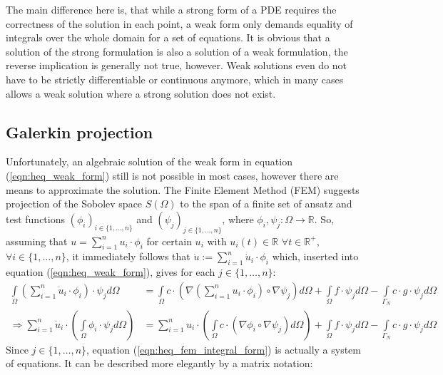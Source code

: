 \documentclass{IOS-Book-Article}
\theoremstyle{plain}
\theoremstyle{definition}
\begin{document}
The main difference here is, that while a strong form of a PDE requires the correctness of the solution in each point, a weak form only demands equality of integrals over the whole domain for a set of equations.
It is obvious that a solution of the strong formulation is also a solution of a weak formulation, the reverse implication is generally not true, however. Weak solutions even do not have to be strictly differentiable or continuous anymore, which in many cases allows a weak solution where a strong solution does not exist.

\subsection{Galerkin projection}

Unfortunately, an algebraic solution of the weak form in equation (\ref{eqn:heq_weak_form}) still is not possible in most cases, however there are means to approximate the solution.
The Finite Element Method (FEM) suggests projection of the Sobolev space $S(\Omega)$ to the span of a finite set of ansatz and test functions $(\phi_i)_{i \in \{1, \dots , n\}}$ and $(\psi_j)_{j \in \{1, \dots , n\}}$, where $\phi_i, \psi_j : \Omega \rightarrow \mathbb{R}$.
So, assuming that $u = \sum \limits_{i = 1}^{n} u_i \cdot \phi_i$ for certain $u_i$ with $u_i(t) \in \mathbb{R}$ $\forall t \in \mathbb{R}^{+}$, $\forall i \in \{1, \dots , n\}$, it immediately follows that $\dot u := \sum \limits_{i = 1}^{n} \dot u_i \cdot \phi_i$ which, inserted into equation (\ref{eqn:heq_weak_form}), gives for each $j \in \{1, \dots , n\}$:
\begin{align}
	\int \limits_{\Omega} (\sum \limits_{i = 1}^{n} \dot u_i \cdot \phi_i) \cdot \psi_j d\Omega &= \int \limits_{\Omega} c \cdot (\nabla (\sum \limits_{i = 1}^{n} u_i \cdot \phi_i) \circ \nabla \psi_j) d\Omega + \int 
	\limits_{\Omega} f \cdot \psi_j d\Omega - \int \limits_{\Gamma_N} c \cdot g \cdot \psi_j d\Omega \\
	\Rightarrow \sum \limits_{i = 1}^{n} \dot u_i \cdot \left( \int \limits_{\Omega} \phi_i \cdot \psi_j d\Omega \right) &= \sum \limits_{i = 1}^{n} u_i \cdot \left( \int \limits_{\Omega} c \cdot (\nabla \phi_i \circ \nabla \psi_j) d\Omega \right) + \int \limits_{\Omega} f \cdot \psi_j d\Omega - \int \limits_{\Gamma_N} c \cdot g \cdot \psi_j d\Omega
	\label{eqn:heq_fem_integral_form}
\end{align}
Since $j \in \{1, \dots , n\}$, equation (\ref{eqn:heq_fem_integral_form}) is actually a system of equations. It can be described more elegantly by a matrix notation:
\end{document}
